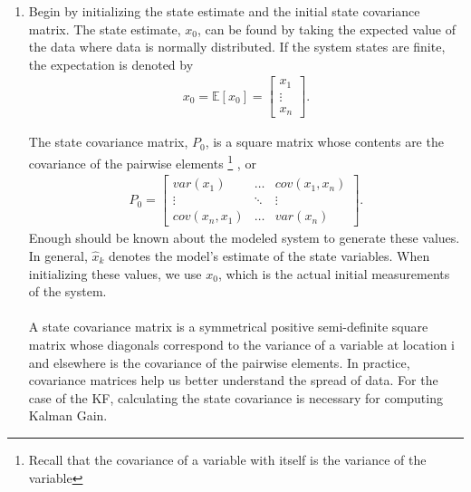 \begin{enumerate}
  \item Begin by initializing the state estimate and the initial state covariance matrix. The state estimate, $x_0$, can be found by taking the expected value of the data where data is normally distributed. If the system states are finite, the expectation is denoted by
    \begin{align*}
        x_0 = \mathbb{E}[x_0]  = \begin{bmatrix}
           x_1 \\
           \vdots \\
           x_n 
         \end{bmatrix}.
    \end{align*}
    
    The state covariance matrix, $P_0$, is a square matrix whose contents are the covariance of the pairwise elements
    \footnote{Recall that the covariance of a variable with itself is the variance of the variable}
    , or
    \begin{align*}
      P_0 =
      \begin{bmatrix}
           var(x_1)  & \hdots & cov(x_1,x_n) \\
           \vdots & \ddots & \vdots \\
           cov(x_n, x_1)  & \hdots & var(x_n )
         \end{bmatrix} .
  \end{align*}
  Enough should be known about the modeled system to generate these values. In general, $\hat x_k$ denotes the model's estimate of the state variables. When initializing these values, we use $x_0$, which is the actual initial measurements of the system. \\ \\
   A state covariance matrix is a symmetrical positive semi-definite square matrix whose diagonals correspond to the variance of a variable at location i and elsewhere is the covariance of the pairwise elements. In practice, covariance matrices help us better understand the spread of data. For the case of the KF, calculating the state covariance is necessary for computing Kalman Gain. 
   

\end{enumerate}
